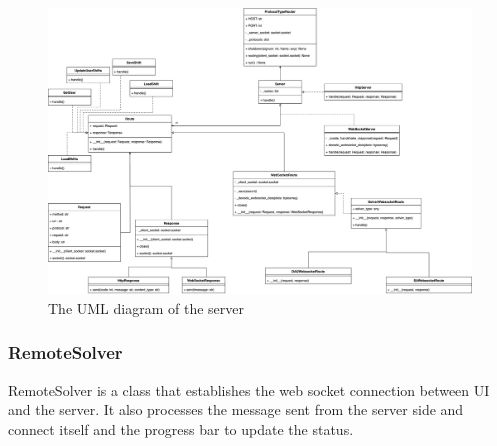\documentclass[11pt, oneside]{article}   	%
\begin{document}
\begin{figure}[h]
\centering
\includegraphics[width=\textwidth]{serverUML}
\caption{The UML diagram of the server}
\label{serveruml}
\end{figure}

\subsubsection{RemoteSolver}
RemoteSolver is a class that establishes the web socket connection between UI and the server. 
It also processes the message sent from the server side and connect itself and the progress bar to update the status.
\end{document}
